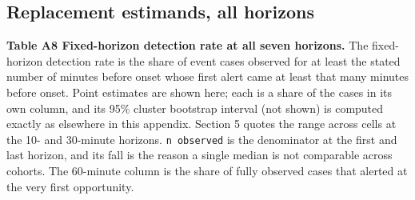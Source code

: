 \subsection{Replacement estimands, all horizons}\label{replacement-estimands-all-horizons}

\begin{minipage}{\linewidth}
\textbf{Table A8 \textbar{} Fixed-horizon detection rate at all seven horizons.} The
fixed-horizon detection rate is the share of event cases observed for at least the stated number
of minutes before onset whose first alert came at least that many minutes before onset. Point
estimates are shown here; each is a share of the cases in its own column, and its 95\% cluster
bootstrap interval (not shown) is computed exactly as elsewhere in this appendix. Section 5 quotes the
range across cells at the 10- and 30-minute horizons. \texttt{n\ observed} is the denominator at the
first and last horizon, and its fall is the reason a single median is not comparable across cohorts. The
60-minute column is the share of fully observed cases that alerted at the very first opportunity.


\end{minipage}
